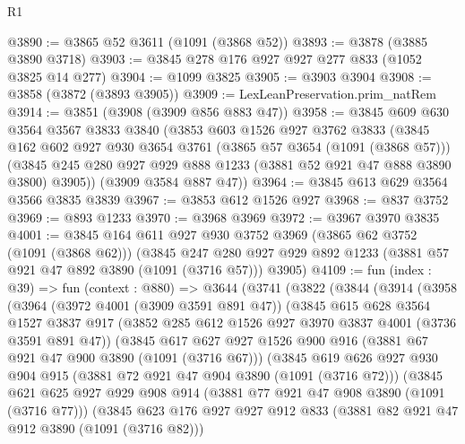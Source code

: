 \begin{lexlean}{R1}
\begin{coremodule}
@3890 := @3865 @52 @3611 (@1091 (@3868 @52))
@3893 := @3878 (@3885 @3890 @3718)
@3903 := @3845 @278 @176 @927 @927 @277 @833 (@1052 @3825 @14 @277)
@3904 := @1099 @3825
@3905 := @3903 @3904
@3908 := @3858 (@3872 (@3893 @3905))
@3909 := LexLeanPreservation.prim_natRem
@3914 := @3851 (@3908 (@3909 @856 @883 @47))
@3958 := @3845
    @609
    @630
    @3564
    @3567
    @3833
    @3840
    (@3853
      @603
      @1526
      @927
      @3762
      @3833
      (@3845
        @162
        @602
        @927
        @930
        @3654
        @3761
        (@3865 @57 @3654 (@1091 (@3868 @57)))
        (@3845 @245 @280 @927 @929 @888 @1233 (@3881 @52 @921 @47 @888 @3890 @3800) @3905))
      (@3909 @3584 @887 @47))
@3964 := @3845 @613 @629 @3564 @3566 @3835 @3839
@3967 := @3853 @612 @1526 @927
@3968 := @837 @3752
@3969 := @893 @1233
@3970 := @3968 @3969
@3972 := @3967 @3970 @3835
@4001 := @3845
    @164
    @611
    @927
    @930
    @3752
    @3969
    (@3865 @62 @3752 (@1091 (@3868 @62)))
    (@3845 @247 @280 @927 @929 @892 @1233 (@3881 @57 @921 @47 @892 @3890 (@1091 (@3716 @57))) @3905)
@4109 := fun (index : @39) =>
  fun (context : @880) =>
  @3644
    (@3741
      (@3822
        (@3844
          (@3914
            (@3958
              (@3964
                (@3972 @4001 (@3909 @3591 @891 @47))
                (@3845
                  @615
                  @628
                  @3564
                  @1527
                  @3837
                  @917
                  (@3852 @285 @612 @1526 @927 @3970 @3837 @4001 (@3736 @3591 @891 @47))
                  (@3845
                    @617
                    @627
                    @927
                    @1526
                    @900
                    @916
                    (@3881 @67 @921 @47 @900 @3890 (@1091 (@3716 @67)))
                    (@3845
                      @619
                      @626
                      @927
                      @930
                      @904
                      @915
                      (@3881 @72 @921 @47 @904 @3890 (@1091 (@3716 @72)))
                      (@3845
                        @621
                        @625
                        @927
                        @929
                        @908
                        @914
                        (@3881 @77 @921 @47 @908 @3890 (@1091 (@3716 @77)))
                        (@3845
                          @623
                          @176
                          @927
                          @927
                          @912
                          @833
                          (@3881 @82 @921 @47 @912 @3890 (@1091 (@3716 @82)))

\end{coremodule}
\end{lexlean}
